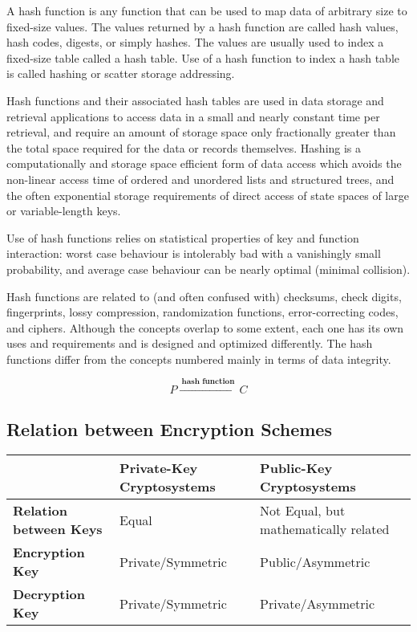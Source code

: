 \documentclass[british]{article}
\providecommand{\tabularnewline}{\\}
\providecommand{\tabularnewline}{\\}
\begin{document}
A hash function is any function that can be used to map data of arbitrary
size to fixed-size values. The values returned by a hash function
are called hash values, hash codes, digests, or simply hashes. The
values are usually used to index a fixed-size table called a hash
table. Use of a hash function to index a hash table is called hashing
or scatter storage addressing.

Hash functions and their associated hash tables are used in data storage
and retrieval applications to access data in a small and nearly constant
time per retrieval, and require an amount of storage space only fractionally
greater than the total space required for the data or records themselves.
Hashing is a computationally and storage space efficient form of data
access which avoids the non-linear access time of ordered and unordered
lists and structured trees, and the often exponential storage requirements
of direct access of state spaces of large or variable-length keys.

Use of hash functions relies on statistical properties of key and
function interaction: worst case behaviour is intolerably bad with
a vanishingly small probability, and average case behaviour can be
nearly optimal (minimal collision).

Hash functions are related to (and often confused with) checksums,
check digits, fingerprints, lossy compression, randomization functions,
error-correcting codes, and ciphers. Although the concepts overlap
to some extent, each one has its own uses and requirements and is
designed and optimized differently. The hash functions differ from
the concepts numbered mainly in terms of data integrity.

\[
P\xrightarrow{\:\textbf{hash function}\:}C
\]


\subsection{Relation between Encryption Schemes}
\begin{center}
\begin{tabular}{|l||l|l|}
\hline 
 & \textbf{Private-Key Cryptosystems}  & \textbf{Public-Key Cryptosystems}\tabularnewline
\hline 
\hline 
\textbf{Relation between Keys}  & Equal  & Not Equal, but mathematically related\tabularnewline
\hline 
\textbf{Encryption Key}  & Private/Symmetric  & Public/Asymmetric\tabularnewline
\hline 
\textbf{Decryption Key}  & Private/Symmetric  & Private/Asymmetric\tabularnewline
\hline 
\end{tabular}
\par\end{center}
\end{document}
